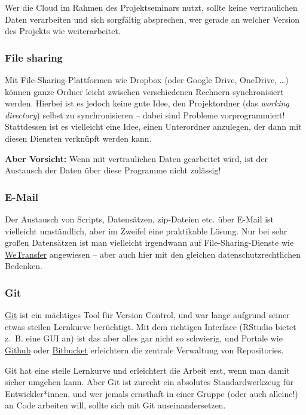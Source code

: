 \documentclass[
  ngerman,
]{article}
\begin{document}
Wer die Cloud im Rahmen des Projektseminars nutzt, sollte keine vertraulichen Daten verarbeiten und sich sorgfältig absprechen, wer gerade an welcher Version des Projekts wie weiterarbeitet.

\hypertarget{file-sharing}{%
\subsubsection{File sharing}\label{file-sharing}}

Mit File-Sharing-Plattformen wie Dropbox (oder Google Drive, OneDrive, \ldots) können ganze Ordner leicht zwischen verschiedenen Rechnern synchronisiert werden. Hierbei ist es jedoch keine gute Idee, den Projektordner (das \emph{working directory}) selbst zu synchronisieren -- dabei sind Probleme vorprogrammiert! Stattdessen ist es vielleicht eine Idee, einen Unterordner anzulegen, der dann mit diesen Diensten verknüpft werden kann.

\textbf{Aber Vorsicht:} Wenn mit vertraulichen Daten gearbeitet wird, ist der Austausch der Daten über diese Programme nicht zulässig!

\hypertarget{e-mail}{%
\subsubsection{E-Mail}\label{e-mail}}

Der Austausch von Scripts, Datensätzen, zip-Dateien etc. über E-Mail ist vielleicht umständlich, aber im Zweifel eine praktikable Lösung. Nur bei sehr großen Datensätzen ist man vielleicht irgendwann auf File-Sharing-Dienste wie \href{https://wetransfer.com/}{WeTransfer} angewiesen -- aber auch hier mit den gleichen datenschutzrechtlichen Bedenken.

\hypertarget{git}{%
\subsubsection{Git}\label{git}}

\href{https://git-scm.com/}{Git} ist ein mächtiges Tool für Version Control, und war lange aufgrund seiner etwas steilen Lernkurve berüchtigt. Mit dem richtigen Interface (RStudio bietet z.~B. eine GUI an) ist das aber alles gar nicht so schwierig, und Portale wie \href{https://github.com}{Github} oder \href{https://bitbucket.org/}{Bitbucket} erleichtern die zentrale Verwaltung von Repositories.

Git hat eine steile Lernkurve und erleichtert die Arbeit erst, wenn man damit sicher umgehen kann.
Aber Git ist zurecht ein absolutes Standardwerkzeug für Entwickler*innen, und wer jemals ernsthaft in einer Gruppe (oder auch alleine!) an Code arbeiten will, sollte sich mit Git auseinandersetzen.
\end{document}
